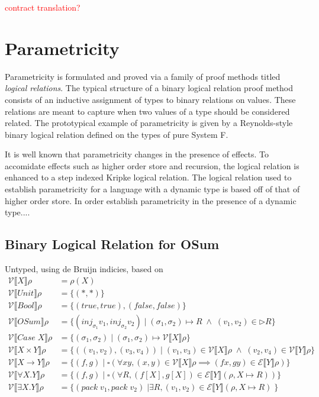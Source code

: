 \documentclass{article}
\newcommand{\red}[1]{\textcolor{red}{#1}}
\begin{document}
\red{contract translation?}

\section{Parametricity}

Parametricity is formulated and proved via a family of proof methods titled \textit{logical relations}.
The typical structure of a binary logical relation proof method consists of an inductive assignment of 
types to binary relations on values. 
These relations are meant to capture when two values of a type should be considered related.
The prototypical example of parametricity is given by a Reynolds-style binary logical relation defined on the types of pure System F.

It is well known that parametricity changes in the presence of effects.
To accomidate effects such as higher order store and recursion, 
the logical relation is enhanced to a step indexed Kripke logical relation.
The logical relation used to establish parametricity for a language with a dynamic type
is based off of that of higher order store. In order establish parametricity in 
the presence of a dynamic type....

\subsection{Binary Logical Relation for OSum}
Untyped, using de Bruijn indicies, based on \cite{ALogicalApproachTypeSound}
\begin{align*}
\mathcal{V}\llbracket X\rrbracket\rho&= \rho(X)\\
\mathcal{V}\llbracket Unit\rrbracket\rho&=\{(*,*)\}\\
\mathcal{V}\llbracket Bool\rrbracket\rho&=\{(true,true),(false,false)\}\\
\mathcal{V}\llbracket OSum\rrbracket\rho&=\{(inj_{\sigma_1} v_1, inj_{\sigma_2} v_2) \;|\;
(\sigma_1 , \sigma_2) \mapsto R \;\land\; (v_1,v_2) \in \rhd R  \}\\
\mathcal{V}\llbracket Case \;X\rrbracket\rho&=\{(\sigma_1 , \sigma_2) \; | \; (\sigma_1 , \sigma_2) \mapsto \mathcal{V}\llbracket X \rrbracket \rho \}\\
\mathcal{V}\llbracket X \times Y \rrbracket\rho&= \{((v_1,v_2),(v_3,v_4)) 
\;|\; (v_1,v_3) \in \mathcal{V}\llbracket X \rrbracket \rho
\; \land \; (v_2,v_4) \in \mathcal{V}\llbracket Y \rrbracket \rho\}\\
\mathcal{V}\llbracket X \rightarrow Y \rrbracket\rho&= 
\{ (f,g) \; | \; \square (\forall x y, (x , y) \in \mathcal{V}\llbracket X \rrbracket \rho \implies (f x , g y) \in \mathcal{E}\llbracket Y \rrbracket \rho)\} \\
\mathcal{V}\llbracket \forall X. Y\rrbracket\rho&= 
\{(f , g) \;| \; \square (\forall R, (f[X],g[X]) \in \mathcal{E}\llbracket Y \rrbracket (\rho , X \mapsto R))\}\\
\mathcal{V}\llbracket \exists X. Y\rrbracket\rho&= 
\{ (pack \;v_1 , pack \; v_2) \; | \exists R, (v_1,v_2) \in \mathcal{E}\llbracket Y \rrbracket (\rho, X \mapsto R)\; \}\\
\end{align*}
\end{document}
